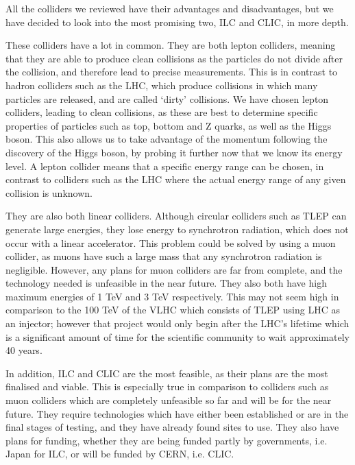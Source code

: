 All the colliders we reviewed have their advantages and disadvantages, but we have decided to look into the most promising two, ILC and CLIC, in more depth.

These colliders have a lot in common. They are both lepton colliders, meaning that they are able to produce clean collisions as the particles do not divide after the collision, and therefore lead to precise measurements. This is in contrast to hadron colliders such as the LHC, which produce collisions in which many particles are released, and are called `dirty' collisions. We have chosen lepton colliders, leading to clean collisions, as these are best to determine specific properties of particles such as top, bottom and Z quarks, as well as the Higgs boson. This also allows us to take advantage of the momentum following the discovery of the Higgs boson, by probing it further now that we know its energy level. A lepton collider means that a specific energy range can be chosen, in contrast to colliders such as the LHC where the actual energy range of any given collision is unknown.

They are also both linear colliders. Although circular colliders such as TLEP can generate large energies, they lose energy to synchrotron radiation, which does not occur with a linear accelerator. This problem could be solved by using a muon collider, as muons have such a large mass that any synchrotron radiation is negligible. However, any plans for muon colliders are far from complete, and the technology needed is unfeasible in the near future. They also both have high maximum energies of 1 TeV and 3 TeV respectively. This may not seem high in comparison to the 100 TeV of the VLHC which consists of TLEP using LHC as an injector; however that project would only begin after the LHC's lifetime which is a significant amount of time for the scientific community to wait \textendash approximately 40 years.

In addition, ILC and CLIC are the most feasible, as their plans are the most finalised and viable. This is especially true in comparison to colliders such as muon colliders which are completely unfeasible so far and will be for the near future. They require technologies which have either been established or are in the final stages of testing, and they have already found sites to use. They also have plans for funding, whether they are being funded partly by governments, i.e. Japan for ILC, or will be funded by CERN, i.e. CLIC.